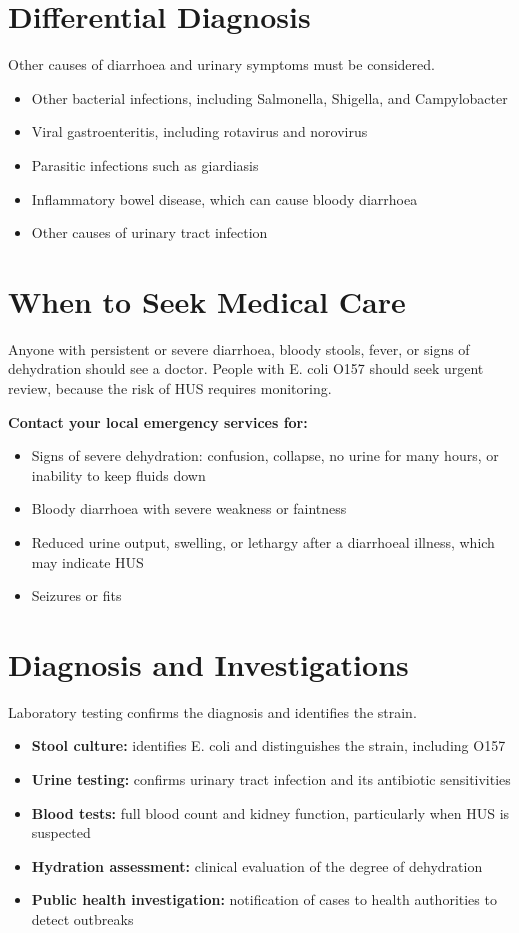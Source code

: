 \section*{Differential Diagnosis}
Other causes of diarrhoea and urinary symptoms must be considered.
\begin{itemize}
    \item Other bacterial infections, including Salmonella, Shigella, and Campylobacter
    \item Viral gastroenteritis, including rotavirus and norovirus
    \item Parasitic infections such as giardiasis
    \item Inflammatory bowel disease, which can cause bloody diarrhoea
    \item Other causes of urinary tract infection
\end{itemize}

\section*{When to Seek Medical Care}
Anyone with persistent or severe diarrhoea, bloody stools, fever, or signs of dehydration should see a doctor. People with E. coli O157 should seek urgent review, because the risk of HUS requires monitoring.

\textbf{Contact your local emergency services for:}
\begin{itemize}
    \item Signs of severe dehydration: confusion, collapse, no urine for many hours, or inability to keep fluids down
    \item Bloody diarrhoea with severe weakness or faintness
    \item Reduced urine output, swelling, or lethargy after a diarrhoeal illness, which may indicate HUS
    \item Seizures or fits
\end{itemize}

\section*{Diagnosis and Investigations}
Laboratory testing confirms the diagnosis and identifies the strain.
\begin{itemize}
    \item \textbf{Stool culture:} identifies E. coli and distinguishes the strain, including O157
    \item \textbf{Urine testing:} confirms urinary tract infection and its antibiotic sensitivities
    \item \textbf{Blood tests:} full blood count and kidney function, particularly when HUS is suspected
    \item \textbf{Hydration assessment:} clinical evaluation of the degree of dehydration
    \item \textbf{Public health investigation:} notification of cases to health authorities to detect outbreaks
\end{itemize}

